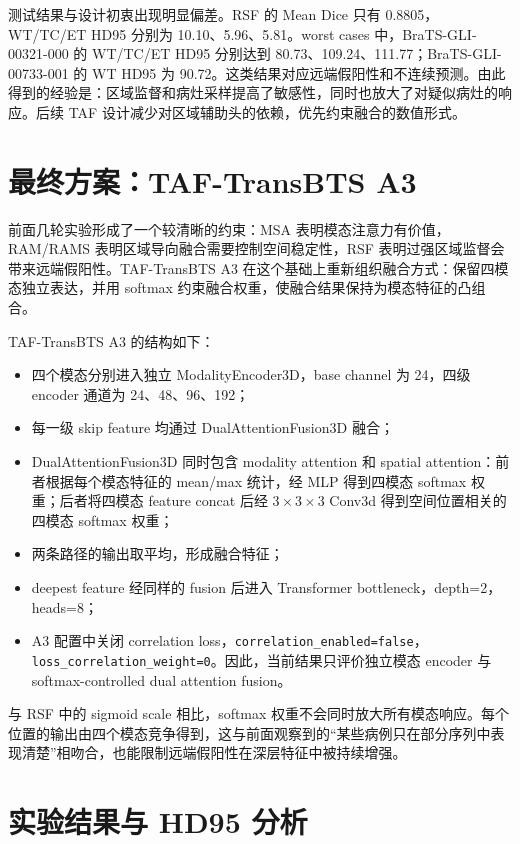 \documentclass[UTF8,11pt]{ctexart}
\begin{document}
测试结果与设计初衷出现明显偏差。RSF 的 Mean Dice 只有 0.8805，WT/TC/ET HD95 分别为 10.10、5.96、5.81。worst cases 中，BraTS-GLI-00321-000 的 WT/TC/ET HD95 分别达到 80.73、109.24、111.77；BraTS-GLI-00733-001 的 WT HD95 为 90.72。这类结果对应远端假阳性和不连续预测。由此得到的经验是：区域监督和病灶采样提高了敏感性，同时也放大了对疑似病灶的响应。后续 TAF 设计减少对区域辅助头的依赖，优先约束融合的数值形式。

\section{最终方案：TAF-TransBTS A3}

前面几轮实验形成了一个较清晰的约束：MSA 表明模态注意力有价值，RAM/RAMS 表明区域导向融合需要控制空间稳定性，RSF 表明过强区域监督会带来远端假阳性。TAF-TransBTS A3 在这个基础上重新组织融合方式：保留四模态独立表达，并用 softmax 约束融合权重，使融合结果保持为模态特征的凸组合。

TAF-TransBTS A3 的结构如下：
\begin{itemize}
  \item 四个模态分别进入独立 ModalityEncoder3D，base channel 为 24，四级 encoder 通道为 24、48、96、192；
  \item 每一级 skip feature 均通过 DualAttentionFusion3D 融合；
  \item DualAttentionFusion3D 同时包含 modality attention 和 spatial attention：前者根据每个模态特征的 mean/max 统计，经 MLP 得到四模态 softmax 权重；后者将四模态 feature concat 后经 $3\times3\times3$ Conv3d 得到空间位置相关的四模态 softmax 权重；
  \item 两条路径的输出取平均，形成融合特征；
  \item deepest feature 经同样的 fusion 后进入 Transformer bottleneck，depth=2，heads=8；
  \item A3 配置中关闭 correlation loss，\texttt{correlation\_enabled=false}，\texttt{loss\_correlation\_weight=0}。因此，当前结果只评价独立模态 encoder 与 softmax-controlled dual attention fusion。
\end{itemize}

与 RSF 中的 sigmoid scale 相比，softmax 权重不会同时放大所有模态响应。每个位置的输出由四个模态竞争得到，这与前面观察到的“某些病例只在部分序列中表现清楚”相吻合，也能限制远端假阳性在深层特征中被持续增强。

\section{实验结果与 HD95 分析}
\end{document}
